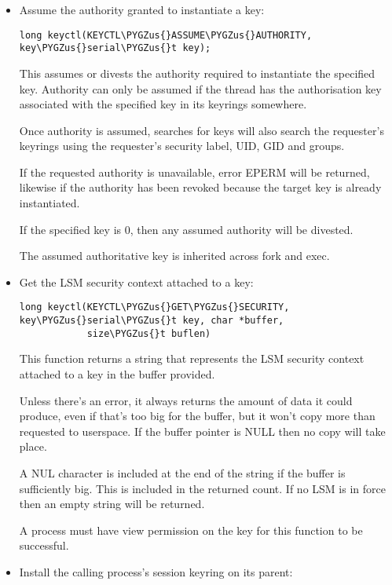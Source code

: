 \documentclass[a4paper,8pt,english]{sphinxmanual}
\def\PYGZus{\char`\_}
\begin{document}
\begin{itemize}
\item {} 
Assume the authority granted to instantiate a key:

\begin{Verbatim}[commandchars=\\\{\}]
long keyctl(KEYCTL\PYGZus{}ASSUME\PYGZus{}AUTHORITY, key\PYGZus{}serial\PYGZus{}t key);
\end{Verbatim}

This assumes or divests the authority required to instantiate the
specified key. Authority can only be assumed if the thread has the
authorisation key associated with the specified key in its keyrings
somewhere.

Once authority is assumed, searches for keys will also search the
requester's keyrings using the requester's security label, UID, GID and
groups.

If the requested authority is unavailable, error EPERM will be returned,
likewise if the authority has been revoked because the target key is
already instantiated.

If the specified key is 0, then any assumed authority will be divested.

The assumed authoritative key is inherited across fork and exec.

\item {} 
Get the LSM security context attached to a key:

\begin{Verbatim}[commandchars=\\\{\}]
long keyctl(KEYCTL\PYGZus{}GET\PYGZus{}SECURITY, key\PYGZus{}serial\PYGZus{}t key, char *buffer,
            size\PYGZus{}t buflen)
\end{Verbatim}

This function returns a string that represents the LSM security context
attached to a key in the buffer provided.

Unless there's an error, it always returns the amount of data it could
produce, even if that's too big for the buffer, but it won't copy more
than requested to userspace. If the buffer pointer is NULL then no copy
will take place.

A NUL character is included at the end of the string if the buffer is
sufficiently big.  This is included in the returned count.  If no LSM is
in force then an empty string will be returned.

A process must have view permission on the key for this function to be
successful.

\item {} 
Install the calling process's session keyring on its parent:


\end{itemize}
\end{document}
